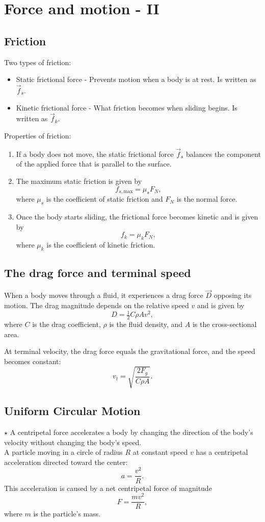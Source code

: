 \section{Force and motion - II}

\subsection{Friction}
Two types of friction:
\begin{itemize}
    \item Static frictional force - Prevents motion when a body is at rest. Is written as $\vec{f}_s$.
    \item Kinetic frictional force - What friction becomes when sliding begins. Is written as $\vec{f}_k$.
\end{itemize}
Properties of friction:
\begin{enumerate}
    \item If a body does not move, the static frictional force $\vec{f}_s$ balances the component of the applied force that is parallel to the surface.

    \item The maximum static friction is given by
    \[
    f_{s,\text{max}} = \mu_s F_N,
    \]
    where $\mu_s$ is the coefficient of static friction and $F_N$ is the normal force.

    \item Once the body starts sliding, the frictional force becomes kinetic and is given by
    \[
    f_k = \mu_k F_N,
    \]
    where $\mu_k$ is the coefficient of kinetic friction.
\end{enumerate}

\subsection{The drag force and terminal speed}
When a body moves through a fluid, it experiences a drag force $\vec{D}$ opposing its motion. The drag magnitude depends on the relative speed $v$ and is given by
\[
D = \tfrac{1}{2} C \rho A v^2,
\]
where $C$ is the drag coefficient, $\rho$ is the fluid density, and $A$ is the cross-sectional area.

At terminal velocity, the drag force equals the gravitational force, and the speed becomes constant:
\[
v_t = \sqrt{\frac{2F_g}{C \rho A}}.
\]

\subsection{Uniform Circular Motion}
$\star$ A centripetal force accelerates a body by changing the direction of the body’s
velocity without changing the body’s speed.\\
A particle moving in a circle of radius $R$ at constant speed $v$ has a centripetal acceleration directed toward the center:
\[
a = \frac{v^2}{R}.
\]
This acceleration is caused by a net centripetal force of magnitude
\[
F = \frac{mv^2}{R},
\]
where $m$ is the particle's mass.
